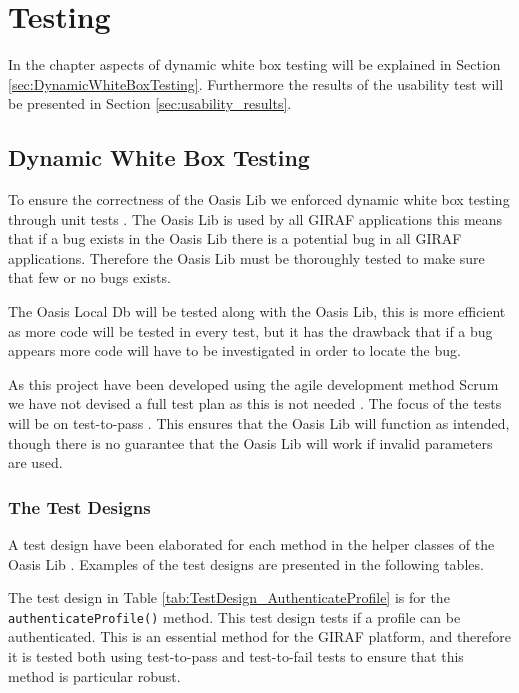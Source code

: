 \chapter{Testing}
In the chapter aspects of dynamic white box testing will be explained in Section \vref{sec:DynamicWhiteBoxTesting}.
Furthermore the results of the usability test will be presented in Section \vref{sec:usability_results}.

\section{Dynamic White Box Testing}
\label{sec:DynamicWhiteBoxTesting}
To ensure the correctness of the Oasis Lib we enforced dynamic white box testing through unit tests \cite[pp106]{Testing} \cite{UnitTesting}.
The Oasis Lib is used by all GIRAF applications this means that if a bug exists in the Oasis Lib there is a potential bug in all GIRAF applications.
Therefore the Oasis Lib must be thoroughly tested to make sure that few or no bugs exists.

The Oasis Local Db will be tested along with the Oasis Lib, this is more efficient as more code will be tested in every test, but it has the drawback that if a bug appears more code will have to be investigated in order to locate the bug.

As this project have been developed using the agile development method Scrum we have not devised a full test plan as this is not needed \cite[pp263]{Testing}. 
The focus of the tests will be on test-to-pass \cite[pp66]{Testing}.
This ensures that the Oasis Lib will function as intended, though there is no guarantee that the Oasis Lib will work if invalid parameters are used.

\subsection{The Test Designs}
\label{sec:testDesign}
A test design have been elaborated for each method in the helper classes of the Oasis Lib \cite[pp281]{Testing}.
Examples of the test designs are presented in the following tables.

The test design in Table \vref{tab:TestDesign_AuthenticateProfile} is for the \texttt{authenticateProfile()} method.
This test design tests if a profile can be authenticated.
This is an essential method for the GIRAF platform, and therefore it is tested both using test-to-pass and test-to-fail tests to ensure that this method is particular robust.

